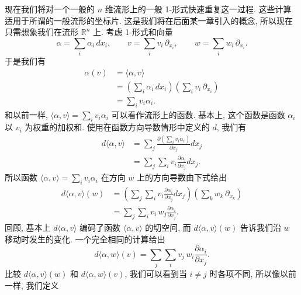 现在我们将对一个一般的 $n$ 维流形上的一般 1-形式快速重复这一过程. 这些计算适用于所谓的一般流形的坐标片. 这是我们将在后面某一章引入的概念, 所以现在只需想象我们在流形 $\mathbb{R}^n$ 上. 考虑 1-形式和向量
\[
\alpha=\sum_i\alpha_i\,dx_i,\qquad
v=\sum_i v_i\,\partial_{x_i},\qquad
w=\sum_i w_i\,\partial_{x_i}.
\]
于是我们有
\begin{align*}
\alpha(v)&=\langle\alpha,v\rangle\\
&=\left(\sum_i\alpha_i\,dx_i\right)\left(\sum_i v_i\,\partial_{x_i}\right)\\
&=\sum_i v_i\alpha_i.
\end{align*}
和以前一样, $\langle\alpha,v\rangle=\sum_i v_i\alpha_i$ 可以看作流形上的函数. 基本上, 这个函数是函数 $\alpha_i$ 以 $v_i$ 为权重的加权和. 使用在函数方向导数情形中定义的 $d$, 我们有
\begin{align*}
d\langle\alpha,v\rangle&=\sum_j\frac{\partial\left(\sum_i v_i\alpha_i\right)}{\partial x_j}dx_j\\
&=\sum_j\sum_i v_i\frac{\partial\alpha_i}{\partial x_j}dx_j.
\end{align*}
所以函数 $\langle\alpha,v\rangle=\sum_i v_i\alpha_i$ 在方向 $w$ 上的方向导数由下式给出
\begin{align*}
d\langle\alpha,v\rangle(w)&=\left(\sum_j\sum_i v_i\frac{\partial\alpha_i}{\partial x_j}dx_j\right)\left(\sum_k w_k\,\partial_{x_k}\right)\\
&=\sum_j\sum_i v_i\,w_j\frac{\partial\alpha_i}{\partial x_j}.
\end{align*}
回顾, 基本上 $d\langle\alpha,v\rangle$ 编码了函数 $\langle\alpha,v\rangle$ 的切空间, 而 $d\langle\alpha,v\rangle(w)$ 告诉我们沿 $w$ 移动时发生的变化. 一个完全相同的计算给出
\[
d\langle\alpha,w\rangle(v)=\sum_j\sum_i v_j\,w_i\frac{\partial\alpha_i}{\partial x_j}.
\]
比较 $d\langle\alpha,v\rangle(w)$ 和 $d\langle\alpha,w\rangle(v)$, 我们可以看到当 $i\neq j$ 时各项不同, 所以像以前一样, 我们定义
